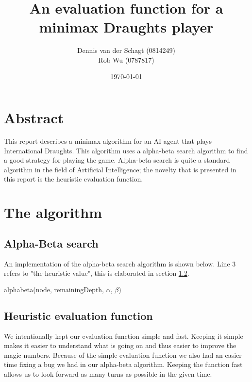 \documentclass[11pt,a4paper]{article}
\title{An evaluation function for a minimax Draughts player}
\author{
Dennis van der Schagt (0814249)\\
Rob Wu (0787817)
}
\date{\today}
\begin{document}
\maketitle
\newpage
\section*{Abstract}
This report describes a minimax algorithm for an AI agent that plays International Draughts. This algorithm uses a alpha-beta search algorithm to find a good strategy for playing the game. Alpha-beta search is quite a standard algorithm in the field of Artificial Intelligence; the novelty that is presented in this report is the heuristic evaluation function.

\section{The algorithm}
\subsection{Alpha-Beta search}
An implementation of the alpha-beta search algorithm is shown below. Line 3 refers to "the heuristic value", this is elaborated in section \ref{section:heuri}.

\begin{function}[H]
	\DontPrintSemicolon
	\caption{alphabeta(node, remainingDepth, $\alpha$, $\beta$)}
\end{function}

\subsection{Heuristic evaluation function}\label{section:heuri}
We intentionally kept our evaluation function simple and fast. Keeping it simple makes it easier to understand what is going on and thus easier to improve the magic numbers. Because of the simple evaluation function we also had an easier time fixing a bug we had in our alpha-beta algorithm. Keeping the function fast allows us to look forward as many turns as possible in the given time.
\end{document}
